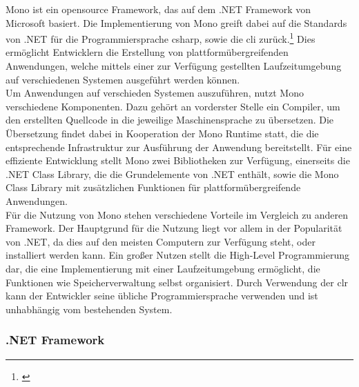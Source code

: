 Mono ist ein opensource Framework, das auf dem .NET Framework von Microsoft basiert. Die Implementierung von Mono greift dabei auf die Standards von .NET für die Programmiersprache \gls{csharp}, sowie die \gls{cli} zurück.\footnote{\citep[vgl.][About Mono]{MonoProject.AboutMono}\label{note6}} Dies ermöglicht Entwicklern die Erstellung von plattformübergreifenden Anwendungen, welche mittels einer zur Verfügung gestellten Laufzeitumgebung auf verschiedenen Systemen ausgeführt werden können.\\
Um Anwendungen auf verschieden Systemen auszuführen, nutzt Mono verschiedene Komponenten. Dazu gehört an vorderster Stelle ein Compiler, um den erstellten Quellcode in die jeweilige Maschinensprache zu übersetzen. Die Übersetzung findet dabei in Kooperation der Mono Runtime statt, die die entsprechende Infrastruktur zur Ausführung der Anwendung bereitstellt. Für eine effiziente Entwicklung stellt Mono zwei Bibliotheken zur Verfügung, einerseits die .NET Class Library, die die Grundelemente von .NET enthält, sowie die Mono Class Library mit zusätzlichen Funktionen für plattformübergreifende Anwendungen.\\
Für die Nutzung von Mono stehen verschiedene Vorteile im Vergleich zu anderen Framework. Der Hauptgrund für die Nutzung liegt vor allem in der Popularität von .NET, da dies auf den meisten Computern zur Verfügung steht, oder installiert werden kann. Ein großer Nutzen stellt die High-Level Programmierung dar, die eine Implementierung mit einer Laufzeitumgebung ermöglicht, die Funktionen wie Speicherverwaltung selbst organisiert. Durch Verwendung der \gls{clr} kann der Entwickler seine übliche Programmiersprache verwenden und ist unhabhängig vom bestehenden System.

\subsubsection{.NET Framework}\label{net}

